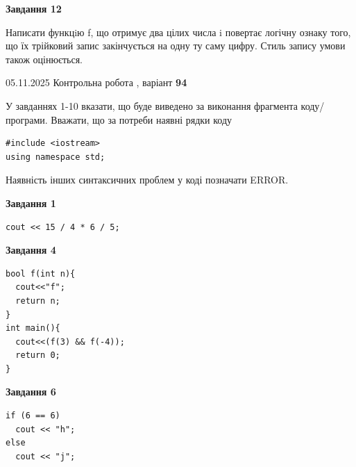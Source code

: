 \documentclass[12pt, ukrainian]{article}
\begin{document}
{\begin {large}
\begin{minipage}[t]{11.0cm}
\begin{center}
\textbf{Завдання 12}
\end{center}

Написати функцiю f, що отримує два цілих числа i повертає логічну ознаку того, що їх трійковий запис закінчується на одну ту саму цифру. Стиль запису умови також оцінюється.\par

\end{minipage}

\end {large}}
\newpage

{\Large{05.11.2025 Контрольна робота , варіант  \No \textbf { 94 }\par}}
{
\begin {large}
У завданнях 1-10 вказати, що буде виведено за виконання фрагмента коду/про\-гра\-ми.
Вважати, що за потреби наявні рядки коду
\begin{verbatim}
#include <iostream>
using namespace std;
\end{verbatim}
Наявність інших синтаксичних проблем у коді позначати ERROR.

\begin{minipage}[t]{7.0cm}

\begin{center}
\textbf{Завдання 1}
\end{center}
\vspace{-8mm}

\begin{verbatim}
cout << 15 / 4 * 6 / 5;
\end{verbatim}



\begin{center}
\textbf{Завдання 4}
\end{center}
\vspace{-8mm}

\begin{verbatim}
bool f(int n){
  cout<<"f";
  return n;
}
int main(){
  cout<<(f(3) && f(-4));
  return 0;
}
\end{verbatim}



\begin{center}
\textbf{Завдання 6}
\end{center}
\vspace{-8mm}

\begin{verbatim}
if (6 == 6)
  cout << "h";
else
  cout << "j";
\end{verbatim}




\end{minipage}
\end{large}}
\end{document}
